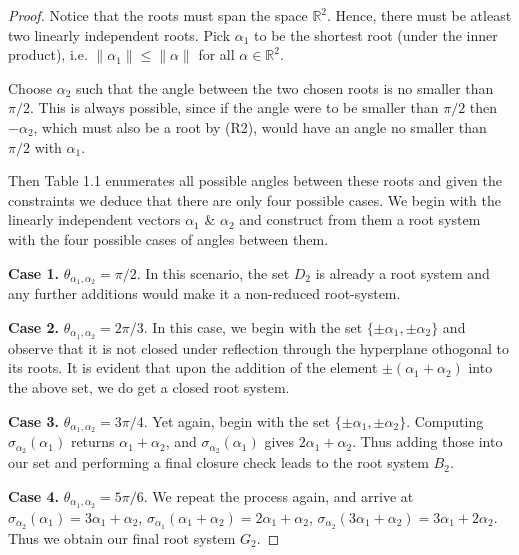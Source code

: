 \begin{proof}
    Notice that the roots must span the space $\mathbb{R}^2$. Hence, there must be atleast two linearly independent roots.
    Pick $\alpha_1$ to be the shortest root (under the inner product), i.e. $\|\alpha_1\| \leq \|\alpha\|$ for all 
    $\alpha \in \mathbb{R}^2$. \newline
    
    Choose $\alpha_2$ such that the angle between the two chosen roots is no smaller than $\pi / 2$.
    This is always possible, since if the angle were to be smaller than $\pi / 2$ then $-\alpha_2$, which must also be a root by (R2),
    would have an angle no smaller than $\pi/2$ with $\alpha_1$. \newline
    
    Then Table 1.1 enumerates all possible angles between these roots and given the constraints we deduce that there are only four
    possible cases. We begin with the linearly independent vectors $\alpha_1$ \& $\alpha_2$ and construct from them a root system
    with the four possible cases of angles between them. \newline

    \textbf{Case 1.} $\theta_{\alpha_1, \alpha_2} = \pi / 2$.
    In this scenario, the set $D_2$ is already a root system and any further additions would make it a non-reduced root-system. \newline

    \textbf{Case 2.} $\theta_{\alpha_1, \alpha_2} = 2\pi / 3$.
    In this case, we begin with the set $\{\pm \alpha_1, \pm \alpha_2 \}$ and observe that it is not closed under reflection through the hyperplane othogonal to its roots.
    It is evident that upon the addition of the element $\pm (\alpha_1 + \alpha_2)$ into the above set, we do get a closed root system. \newline

    \textbf{Case 3.} $\theta_{\alpha_1, \alpha_2} = 3\pi / 4$.
    Yet again, begin with the set $\{\pm \alpha_1, \pm \alpha_2 \}$. Computing $\sigma_{\alpha_2}(\alpha_1)$ returns 
    $\alpha_1 + \alpha_2$, and $\sigma_{\alpha_2}(\alpha_1)$ gives $2\alpha_1 + \alpha_2$. Thus adding those into our set
    and performing a final closure check leads to the root system $B_2$. \newline

    \textbf{Case 4.} $\theta_{\alpha_1, \alpha_2} = 5\pi / 6$.
    We repeat the process again, and arrive at 
        $\sigma_{\alpha_2}(\alpha_1) = 3\alpha_1 + \alpha_2$,
        $\sigma_{\alpha_1}(\alpha_1 + \alpha_2) = 2 \alpha_1 + \alpha_2$,
        $\sigma_{\alpha_2}(3 \alpha_1 + \alpha_2) = 3 \alpha_1 + 2 \alpha_2$.
    Thus we obtain our final root system $G_2$.
\end{proof}